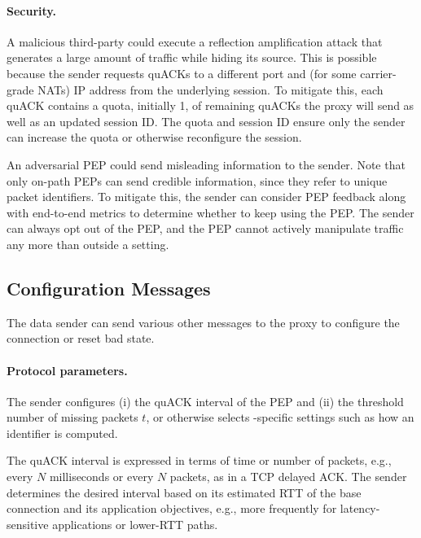 \paragraph{Security.}
A malicious third-party could execute a reflection amplification attack that
generates a large amount of traffic while hiding its source. This is
possible because the sender requests quACKs to a different port and (for some
carrier-grade NATs) IP address from the underlying session. To mitigate this,
each quACK contains a quota, initially 1, of remaining quACKs the proxy will
send as well as an updated session ID\@.
The quota and session ID ensure only the sender can increase the quota or
otherwise reconfigure the session.

An adversarial PEP could send misleading information to the sender. Note that
only on-path PEPs can send credible information, since they refer to unique
packet identifiers.
To mitigate this, the sender can consider PEP feedback along with
end-to-end metrics to determine whether to keep using the PEP. The sender can
always opt out of the PEP, and the PEP cannot actively manipulate traffic any
more than outside a \sys setting.

\subsection{Configuration Messages}
\label{sec:design:configuration}

The data sender can send various other messages to the proxy
to configure the connection or reset bad state.

\paragraph{Protocol parameters.}
The sender configures (i) the quACK interval of the PEP and (ii) the threshold
number of missing packets $t$, or otherwise selects \sys-specific settings
such as how an identifier is computed.


The quACK interval is expressed in terms of time or number of packets,
 e.g., every $N$ milliseconds or every $N$ packets, as in a TCP delayed ACK.
The sender determines the desired interval based on its estimated
RTT of the base connection and its application objectives, e.g.,
more frequently for latency-sensitive applications or lower-RTT paths.
%

